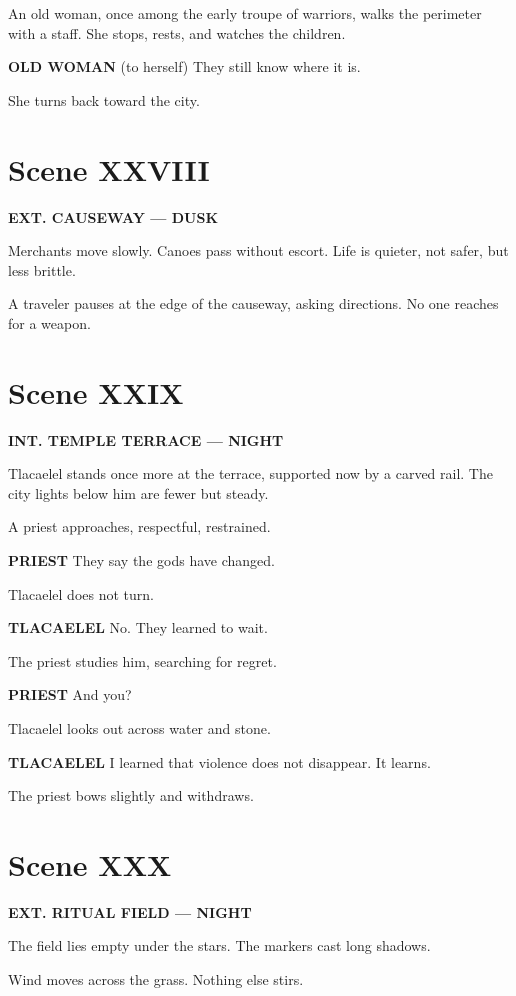 \documentclass[12pt]{article}
\begin{document}
An old woman, once among the early troupe of warriors, walks the perimeter with a staff. She stops, rests, and watches the children.

\textbf{OLD WOMAN}  
(to herself)  
They still know where it is.

She turns back toward the city.

\section*{Scene XXVIII}

\textbf{EXT. CAUSEWAY --- DUSK}

Merchants move slowly. Canoes pass without escort. Life is quieter, not safer, but less brittle.

A traveler pauses at the edge of the causeway, asking directions. No one reaches for a weapon.

\section*{Scene XXIX}

\textbf{INT. TEMPLE TERRACE --- NIGHT}

Tlacaelel stands once more at the terrace, supported now by a carved rail. The city lights below him are fewer but steady.

A priest approaches, respectful, restrained.

\textbf{PRIEST}  
They say the gods have changed.

Tlacaelel does not turn.

\textbf{TLACAELEL}  
No.  
They learned to wait.

The priest studies him, searching for regret.

\textbf{PRIEST}  
And you?

Tlacaelel looks out across water and stone.

\textbf{TLACAELEL}  
I learned that violence does not disappear.  
It learns.

The priest bows slightly and withdraws.

\section*{Scene XXX}

\textbf{EXT. RITUAL FIELD --- NIGHT}

The field lies empty under the stars. The markers cast long shadows.

Wind moves across the grass. Nothing else stirs.
\end{document}

